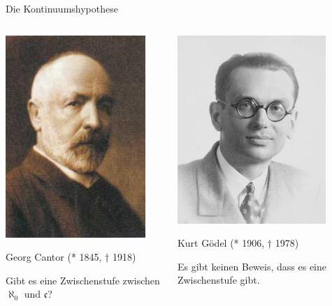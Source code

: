 \documentclass[12pt,compress,ngerman,utf8,t]{beamer}
\begin{document}
\begin{frame}{Die Kontinuumshypothese}
  \begin{columns}[t]
    \begin{column}{0.34\textwidth}
      \centering\includegraphics[height=0.5\textheight]{georg-cantor} \\
      {\scriptsize Georg Cantor (* 1845, † 1918)\par}
      \bigskip

      Gibt es eine Zwischenstufe zwischen $\aleph_0$ und $\mathfrak{c}$?
    \end{column}
    \pause

    \begin{column}{0.34\textwidth}
      \centering\includegraphics[height=0.5\textheight]{kurt-goedel} \\
      {\scriptsize Kurt Gödel (* 1906, † 1978)\par}
      \bigskip

      Es gibt keinen Beweis, dass es eine Zwischenstufe gibt.
    \end{column}
    \pause


\end{columns}
\end{frame}
\end{document}
